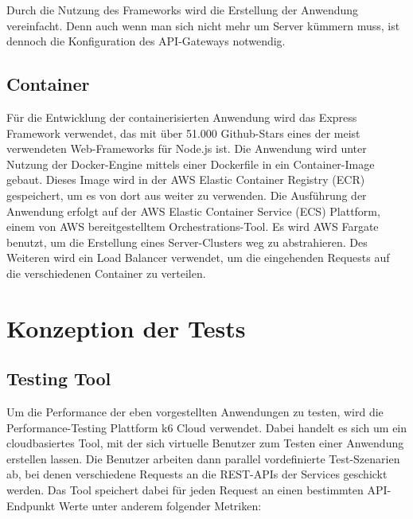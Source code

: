 Durch die Nutzung des Frameworks wird die Erstellung der Anwendung vereinfacht. Denn auch wenn man sich nicht mehr um Server kümmern muss, ist dennoch die Konfiguration des API-Gateways notwendig.

\subsection{Container}
Für die Entwicklung der containerisierten Anwendung wird das Express Framework verwendet, das mit über 51.000 Github-Stars eines der meist verwendeten Web-Frameworks für Node.js ist. Die Anwendung wird unter Nutzung der Docker-Engine mittels einer Dockerfile in ein Container-Image gebaut. Dieses Image wird in der AWS Elastic Container Registry (ECR) gespeichert, um es von dort aus weiter zu verwenden. 
Die Ausführung der Anwendung erfolgt auf der AWS Elastic Container Service (ECS) Plattform, einem von AWS bereitgestelltem Orchestrations-Tool. Es wird AWS Fargate benutzt, um die Erstellung eines Server-Clusters weg zu abstrahieren. Des Weiteren wird ein Load Balancer verwendet, um die eingehenden Requests auf die verschiedenen Container zu verteilen. 

\section{Konzeption der Tests}

\subsection{Testing Tool}
Um die Performance der eben vorgestellten Anwendungen zu testen, wird die Performance-Testing Plattform k6 Cloud\cite{noauthor_load_nodate} verwendet. Dabei handelt es sich um ein cloudbasiertes Tool, mit der sich virtuelle Benutzer zum Testen einer Anwendung erstellen lassen. Die Benutzer arbeiten dann parallel vordefinierte Test-Szenarien ab, bei denen verschiedene Requests an die REST-APIs der Services geschickt werden. Das Tool speichert dabei für jeden Request an einen bestimmten API-Endpunkt Werte unter anderem folgender Metriken: 


